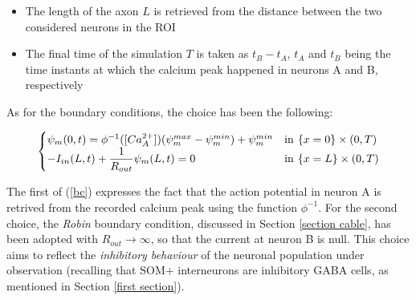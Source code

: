 \documentclass[12pt, a4paper]{report}
\begin{document}
\begin{itemize}
	\item The length of the axon $L$ is retrieved from the distance between the two considered neurons in the ROI
	
	\item The final time of the simulation $T$ is taken as $t_B - t_A$, $t_A$ and $t_B$ being the time instants at which the calcium peak happened in neurons A and B, respectively
	
\end{itemize}




As for the boundary conditions, the choice has been the following:

\begin{equation}
	\begin{cases}
	\psi_m(0,t) = \phi^{-1}([Ca_A^{2+}])(\psi_m^{max} - \psi_m^{min}) + \psi_m^{min} & \text{in} \hspace{0.07 cm} \left\{ x = 0\right\} \times (0,T) \\
	-I_{in}(L,t) + \displaystyle \frac{1}{R_{out}}\psi_m(L,t) =0 & \text{in} \hspace{0.07 cm} \left\{ x = L\right\} \times (0,T)
	\end{cases} \label{bc}
\end{equation}

The first of (\ref{bc}) expresses the fact that the action potential in neuron A is retrived from the recorded calcium peak using the function $\phi^{-1}$. For the second choice, the \textit{Robin} boundary condition, discussed in Section \ref{section cable}, has been adopted with $R_{out} \rightarrow \infty$, so that the current at neuron B is null. This choice aims to reflect the \textit{inhibitory behaviour} of the neuronal population under observation (recalling that SOM+ interneurons are inhibitory GABA cells, as mentioned in Section \ref{first section}).
\end{document}
